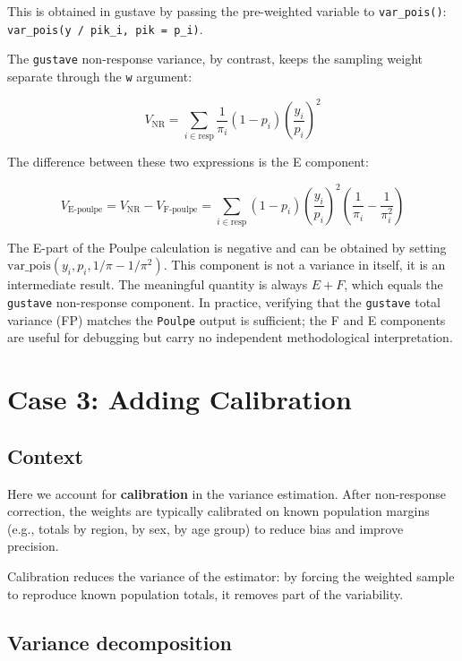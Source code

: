 \documentclass[
]{article}
\begin{document}
This is obtained in gustave by passing the pre-weighted variable to
\texttt{var\_pois()}: \texttt{var\_pois(y\ /\ pik\_i,\ pik\ =\ p\_i)}.

The \texttt{gustave} non-response variance, by contrast, keeps the
sampling weight separate through the \texttt{w} argument:

\[V_{\text{NR}} = \sum_{i\in \text{resp}}{ \frac{1}{\pi_i} (1-p_i) \left(\frac{y_i}{p_i}\right)^2}\]

The difference between these two expressions is the E component:

\[V_{\text{E-poulpe}} = V_{\text{NR}} - V_{\text{F-poulpe}} = \sum_{i\in \text{resp}}{(1-p_i) \left(\frac{y_i}{p_i}\right)^2 \left(\frac{1}{\pi_i} - \frac{1}{\pi_i^2}\right)}\]

The E-part of the Poulpe calculation is negative and can be obtained by
setting \(\text{var\_pois}(y_i,p_i,1/\pi - 1/\pi^2)\). This component is
not a variance in itself, it is an intermediate result. The meaningful
quantity is always \(E + F\), which equals the \texttt{gustave}
non-response component. In practice, verifying that the \texttt{gustave}
total variance (FP) matches the \texttt{Poulpe} output is sufficient;
the F and E components are useful for debugging but carry no independent
methodological interpretation.

\section{Case 3: Adding Calibration}\label{case-3-adding-calibration}

\subsection{Context}\label{context-2}

Here we account for \textbf{calibration} in the variance estimation.
After non-response correction, the weights are typically calibrated on
known population margins (e.g., totals by region, by sex, by age group)
to reduce bias and improve precision.

Calibration reduces the variance of the estimator: by forcing the
weighted sample to reproduce known population totals, it removes part of
the variability.

\subsection{Variance decomposition}\label{variance-decomposition-2}
\end{document}
